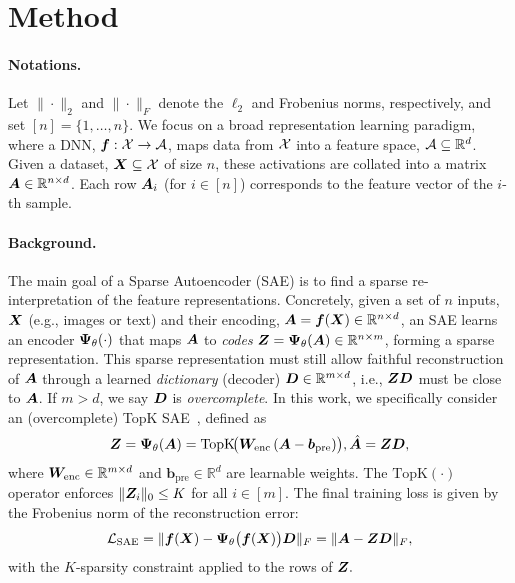 
\vspace{-3mm}
\section{Method}

\vspace{-1mm}
\paragraph{Notations.}
Let $ \|\cdot\|_2 $ and $ \|\cdot\|_F $ denote the $\ell_2$ and Frobenius norms, respectively, and set $ [n] = \{1, \dots, n\} $. We focus on a broad representation learning paradigm, where a DNN, $ \bm{f} : \mathcal{X} \to \mathcal{A} $, maps data from $ \mathcal{X} $ into a feature space, $ \mathcal{A} \subseteq \mathbb{R}^d $. Given a dataset, $ \bm{X} \subseteq \mathcal{X} $ of size $ n $, these activations are collated into a matrix $ \bm{A} \in \mathbb{R}^{n \times d} $. Each row $ \bm{A}_i $ (for $ i \in [n] $) corresponds to the feature vector of the $ i $-th sample.

\vspace{-3.5mm}
\paragraph{Background.} The main goal of a Sparse Autoencoder (SAE) 
is to find a sparse re-interpretation of the feature representations. Concretely, given a set of $n$ inputs, $\bm{X}$ (e.g., images or text) and their encoding, $\bm{A} = \bm{f}(\bm{X}) \in \mathbb{R}^{n \times d}$, an SAE learns an encoder $\bm{\Psi}_{\theta}(\cdot)$ that maps $\bm{A}$ to \emph{codes} $\bm{Z} = \bm{\Psi}_{\theta}(\bm{A}) \in \mathbb{R}^{n \times m}$, forming a sparse representation. This sparse representation must still allow faithful reconstruction of $\bm{A}$ through a learned \emph{dictionary} (decoder) $\bm{D} \in \mathbb{R}^{m \times d}$, i.e., $\bm{Z} \bm{D}$ must be close to $\bm{A}$. If $m > d$, we say $\bm{D}$ is \textit{overcomplete}. In this work, we specifically consider an (overcomplete) TopK SAE~\cite{gao2024scaling}, defined as
\begin{equation}
\bm{Z} = \bm{\Psi}_{\theta}(\bm{A}) = \mathrm{TopK}\!\bigl(\bm{W}_{\text{enc}}\,(\bm{A} - \bm{b}_{\text{pre}})\bigr),  
\hat{\bm{A}} = \bm{Z} \bm{D},
\end{equation}
where $\bm{W}_{\text{enc}} \in \mathbb{R}^{m \times d}$ and $\bm{b}_{\text{pre}} \in \mathbb{R}^{d}$ are learnable weights. The $\mathrm{TopK}(\cdot)$ operator enforces $ \|\bm{Z}_i\|_0 \le K $ for all $ i \in [m] $. The final training loss is given by the Frobenius norm of the reconstruction error:
\begin{equation}
    \mathcal{L}_{\text{SAE}} = \|\bm{f}(\bm{X}) - \bm{\Psi}_{\theta}\bigl(\bm{f}(\bm{X})\bigr)\bm{D}\|_F = \|\bm{A} - \bm{Z} \bm{D}\|_F, 
\end{equation}
with the $K$-sparsity constraint applied to the rows of $ \bm{Z}. $



